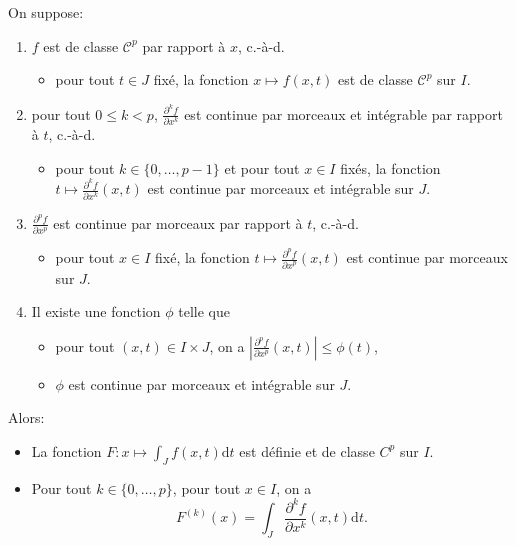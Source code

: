 \documentclass{book}
\begin{document}
\begin{Theoreme}
On suppose:
\begin{enumerate}
\item
  $f$ est de classe $\mathcal{C}^p$ par rapport à $x$, c.-à-d.
  \begin{itemize}
  \item
    pour tout $t\in J$ fixé, la fonction $x \mapsto f(x,t)$ est de classe $\mathcal{C}^p$ sur $I$.
  \end{itemize}
\item
  pour tout $0\leq k<p$,
 $\frac{\partial^k f}{\partial x^k}$ est continue par morceaux
 et intégrable par rapport à $t$, c.-à-d.

  \begin{itemize}
  \item
    pour tout $k\in \{0,\dots,p-1\}$ et pour tout $x\in I$ fixés,
    la fonction $t \mapsto \frac{\partial^k f}{\partial x^k} (x,t)$
    est continue par morceaux et intégrable sur $J$.
  \end{itemize}
\item
  $\frac{\partial^p f}{\partial x^p}$ est continue par morceaux par rapport à $t$, c.-à-d.
  \begin{itemize}
  \item
    pour tout $x\in I$ fixé, la fonction $t \mapsto \frac{\partial^p f}{\partial x^p} (x,t)$
    est continue par morceaux sur $J$.
  \end{itemize}
\item
  Il existe une fonction $\phi$ telle que
  \begin{itemize}
  \item
    pour tout $(x,t)\in I×J$, on a $\left| \frac{\partial^p f}{\partial x^p} (x,t) \right| \leq \phi (t)$,
  \item
    $\phi $ est continue par morceaux et intégrable sur $J$.
  \end{itemize}
\end{enumerate}
Alors:
\begin{itemize}
\item
  La fonction $F \colon x \mapsto \int_J f(x,t) \mathrm dt$ est définie et de classe $C^p$ sur $I$.
\item
  Pour tout $k\in \{0,\dots,p\}$, pour tout $x\in I$,
  on a \[ F^{(k)}(x) = \int_J \frac{\partial^k f}{\partial x^k}(x,t) \mathrm dt. \]
\end{itemize}
\end{Theoreme}
\end{document}
